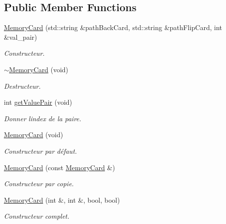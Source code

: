 \subsection*{Public Member Functions}
\begin{DoxyCompactItemize}
\item 
\hyperlink{class_memory_card_a64380fa5fec0bcd01a1907804989ca9c}{Memory\+Card} (std\+::string \&path\+Back\+Card, std\+::string \&path\+Flip\+Card, int \&val\+\_\+pair)
\begin{DoxyCompactList}\small\item\em Constructeur. \end{DoxyCompactList}\item 
\mbox{\label{class_memory_card_a3de3cef7b7af45dbf250435fb5004223}} 
\hyperlink{class_memory_card_a3de3cef7b7af45dbf250435fb5004223}{$\sim$\+Memory\+Card} (void)
\begin{DoxyCompactList}\small\item\em Destructeur. \end{DoxyCompactList}\item 
\mbox{\label{class_memory_card_a1d6b3ba288249cbd619700cc4f4fddd3}} 
int \hyperlink{class_memory_card_a1d6b3ba288249cbd619700cc4f4fddd3}{get\+Value\+Pair} (void)
\begin{DoxyCompactList}\small\item\em Donner l\textquotesingle{}index de la paire. \end{DoxyCompactList}\item 
\hyperlink{class_memory_card_a3d59bf204269e8b83a7eff862a838505}{Memory\+Card} (void)
\begin{DoxyCompactList}\small\item\em Constructeur par défaut. \end{DoxyCompactList}\item 
\hyperlink{class_memory_card_a0afb3e7ead670834a1551dad7b71597a}{Memory\+Card} (const \hyperlink{class_memory_card}{Memory\+Card} \&)
\begin{DoxyCompactList}\small\item\em Constructeur par copie. \end{DoxyCompactList}\item 
\hyperlink{class_memory_card_ac34a1add168e88d58c5f864a35d4b136}{Memory\+Card} (int \&, int \&, bool, bool)
\begin{DoxyCompactList}\small\item\em Constructeur complet. \end{DoxyCompactList}\item 

\end{DoxyCompactItemize}
